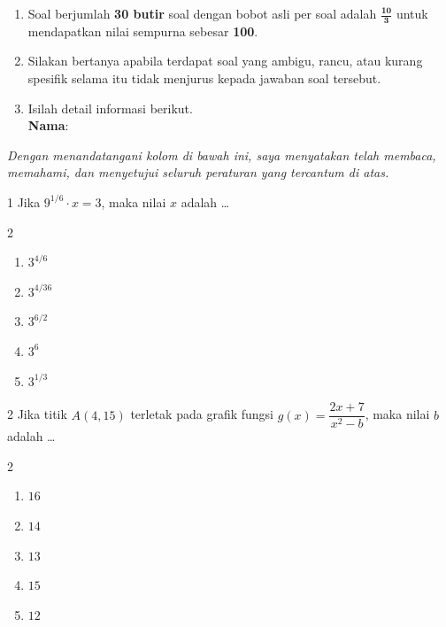 \documentclass[11pt]{article}
\newenvironment{pilB}{%
  \par\smallskip\begin{multicols}{2}
  \begin{enumerate}[label=(\Alph*),leftmargin=*,itemsep=1pt,topsep=3pt]}%
  {\end{enumerate}\end{multicols}}
\begin{document}
\begin{enumerate}[leftmargin=*,itemsep=4pt,topsep=4pt]
  \item Soal berjumlah \textbf{30 butir} soal dengan bobot asli per soal adalah
        $\mathbf{\tfrac{10}{3}}$ untuk mendapatkan nilai sempurna sebesar \textbf{100}.

  \item Silakan bertanya apabila terdapat soal yang ambigu, rancu, atau kurang
        spesifik selama itu tidak menjurus kepada jawaban soal tersebut.

  \item Isilah detail informasi berikut.\\[0.3em]
        \textbf{Nama}\hspace{0.45cm}:\enspace\underline{\hspace{8cm}}
\end{enumerate}

\vspace{0.6cm}
\noindent\textit{Dengan menandatangani kolom di bawah ini, saya menyatakan telah membaca,
memahami, dan menyetujui seluruh peraturan yang tercantum di atas.}

\vspace{0.6cm}
\noindent{}

\clearpage


\begin{soal}{1}
Jika $9^{1/6}\cdot x=3$, maka nilai $x$ adalah \ldots
\begin{pilB}
  \item $3^{4/6}$ \item $3^{4/36}$ \item $3^{6/2}$ \item $3^{6}$ \item $3^{1/3}$
\end{pilB}
\end{soal}

\begin{soal}{2}
Jika titik $A(4,15)$ terletak pada grafik fungsi $g(x)=\dfrac{2x+7}{x^2-b}$,
maka nilai $b$ adalah \ldots
\begin{pilB}
  \item $16$ \item $14$ \item $13$ \item $15$ \item $12$
\end{pilB}
\end{soal}
\end{document}
